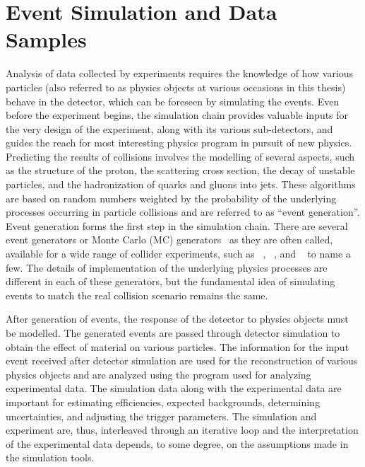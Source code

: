 \chapter{Event Simulation and Data Samples}\label{ch:EventGenSim}

Analysis of data collected by experiments requires the knowledge of how various particles (also referred to as physics objects at various occasions 
in this thesis) behave in the detector, which can be foreseen by simulating the events. Even before the experiment begins, the simulation chain 
provides valuable inputs for the very design of the experiment, along with its various sub-detectors, and guides the reach for most interesting physics 
program in pursuit of new physics. Predicting the results of \pp collisions involves the modelling of several aspects, such as the structure of the 
proton, the scattering cross section, the decay of unstable particles, and the hadronization of quarks and gluons into jets. 
These algorithms are based on random numbers weighted by the probability of the underlying processes occurring in particle collisions and are 
referred to as ``event generation''. Event generation forms the first step in the simulation chain.
There are several event generators or Monte Carlo (MC) generators~\cite{Buckley:2011ms,Dobbs:2004qw} as they are often called, available for a wide 
range of collider experiments, such as \pythia~\cite{Sjostrand:2006za}, \madgraph~\cite{Alwall:2014hca}, and \herwigpp~\cite{Bahr:2008pv} to name a few.
The details of implementation of the underlying physics processes are different in each of these generators, but the fundamental idea of simulating
events to match the real collision scenario remains the same. 

After generation of events, the response of the detector to physics objects must be modelled. The generated events are passed through detector 
simulation to obtain the effect of material on various particles. The information for the input event received after detector simulation are used 
for the reconstruction of various physics objects and are analyzed using the program used for analyzing experimental data. The simulation data 
along with the experimental data are important for estimating efficiencies, expected backgrounds, determining uncertainties, and adjusting the 
trigger parameters. The simulation and experiment are, thus, interleaved through an iterative loop and the interpretation of the experimental data 
depends, to some degree, on the assumptions made in the simulation tools. 

